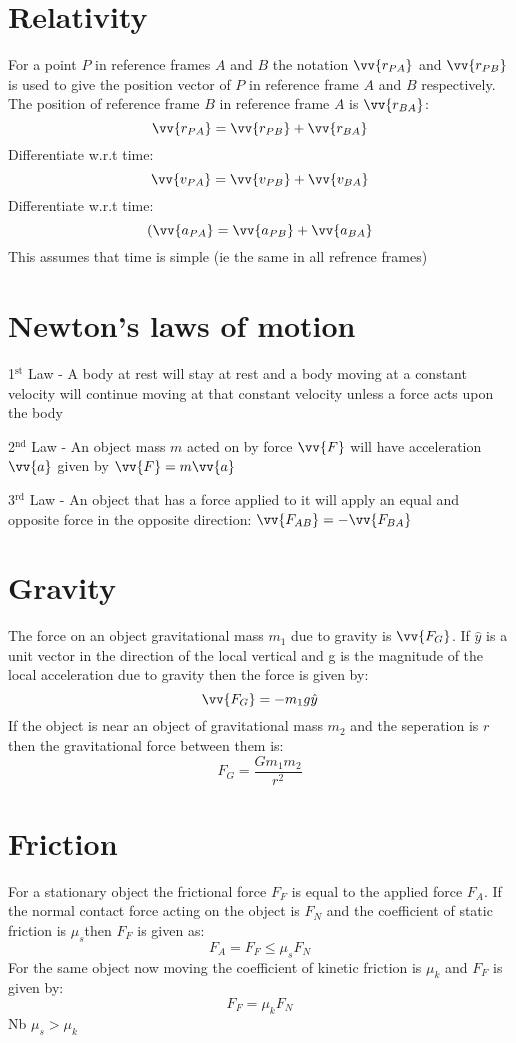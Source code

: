 \documentclass{article}
\begin{document}
\section*{Relativity}

For a point \(P\) in reference frames \(A\) and \(B\) the notation \(\vv{r_{PA}}\) and \(\vv{r_{PB}}\) is used to give the position vector of \(P\) in reference frame \(A\) and \(B\) respectively. The position of reference frame \(B\) in reference frame \(A\) is \(\vv{r_{BA}}\):
\[\vv{r_{PA}}=\vv{r_{PB}}+\vv{r_{BA}}\]
Differentiate w.r.t time:
\[\vv{v_{PA}}=\vv{v_{PB}}+\vv{v_{BA}}\]
Differentiate w.r.t time:
\[(\vv{a_{PA}}=\vv{a_{PB}}+\vv{a_{BA}}\]
This assumes that time is simple (ie the same in all refrence frames)\\

\section*{Newton's laws of motion}

1\(^\text{st}\) Law - A body at rest will stay at rest and a body moving at a constant velocity will continue moving at that constant velocity unless a force acts upon the body

2\(^\text{nd}\) Law - An object mass \(m\) acted on by force \(\vv{F}\) will have acceleration \(\vv{a}\) given by \(\vv{F}=m\vv{a}\)

3\(^\text{rd}\) Law - An object that has a force applied to it will apply an equal and opposite force in the opposite direction: \(\vv{F_{AB}}=-\vv{F_{BA}}\)

\section*{Gravity}

The force on an object gravitational mass \(m_1\) due to gravity is \(\vv{F_G}\). If \(\hat{y}\) is a unit vector in the direction of the local vertical and g is the magnitude of the local acceleration due to gravity then the force is given by:
\[\vv{F_G}=-m_1g\hat{y}\]
If the object is near an object of gravitational mass \(m_2\) and the seperation is \(r\) then the gravitational force between them is:
\[F_G=\frac{Gm_1m_2}{r^2}\]

\section*{Friction}

For a stationary object the frictional force \(F_F\) is equal to the applied force \(F_A\). If the normal contact force acting on the object is \(F_N\) and the coefficient of static friction is \(\mu_s\)then \(F_F\) is given as:
\[F_A=F_F\le\mu_sF_N\]
For the same object now moving the coefficient of kinetic friction is \(\mu_k\) and \(F_F\) is given by:
\[F_F=\mu_kF_N\]
Nb \(\mu_s>\mu_k\)
\end{document}
